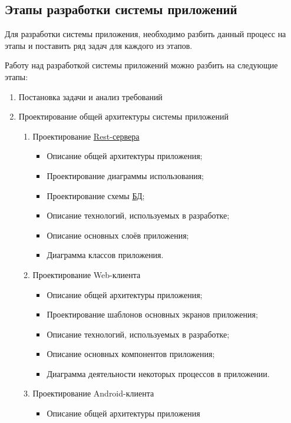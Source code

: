 \subsection{Этапы разработки системы приложений}\label{subsec:2-dev-stages}\indent

Для разработки системы приложения, необходимо разбить данный процесс на этапы и поставить ряд задач для каждого из этапов.

Работу над разработкой системы приложений можно разбить на следующие этапы:

\begin{enumerate}
    \item Постановка задачи и анализ требований
    \item Проектирование общей архитектуры системы приложений
    \begin{enumerate}
        \item Проектирование \hyperlink{gloss:rest}{Rest-сервера}
        \begin{itemize}
            \item Описание общей архитектуры приложения;
            \item Проектирование диаграммы использования;
            \item Проектирование схемы \hyperlink{gloss:db}{БД};
            \item Описание технологий, используемых в разработке;
            \item Описание основных слоёв приложения;
            \item Диаграмма классов приложения.
        \end{itemize}
        \item Проектирование Web-клиента
        \begin{itemize}
            \item Описание общей архитектуры приложения;
            \item Проектирование шаблонов основных экранов приложения;
            \item Описание технологий, используемых в разработке;
            \item Описание основных компонентов приложения;
            \item Диаграмма деятельности некоторых процессов в приложении.
        \end{itemize}
        \item Проектирование Android-клиента
        \begin{itemize}
            \item Описание общей архитектуры приложения

\end{itemize}
\end{enumerate}
\end{enumerate}
